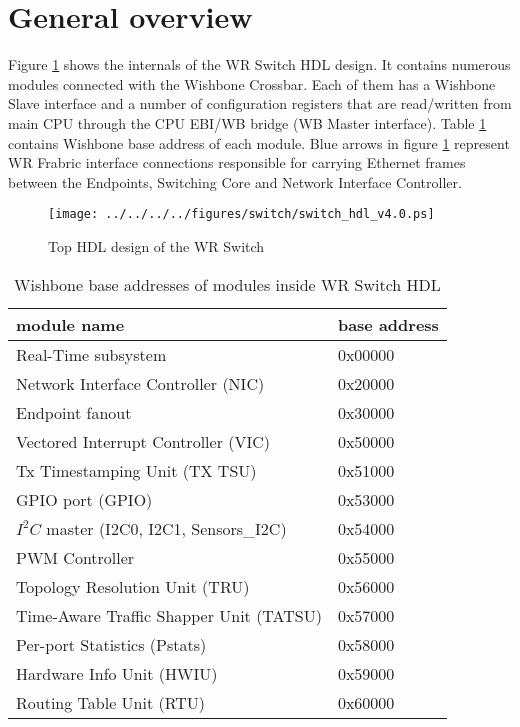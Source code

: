 \section{General overview}

Figure \ref{fig:switch_top} shows the internals of the WR Switch HDL
design. It contains numerous modules connected with the Wishbone Crossbar.
Each of them has a Wishbone Slave interface and a number of configuration
registers that are read/written from main CPU through the CPU EBI/WB bridge (WB
Master interface). Table \ref{tab:gov:wb_base} contains Wishbone base address of
each module. Blue arrows
in figure \ref{fig:switch_top} represent WR Frabric interface connections
responsible for carrying Ethernet frames between the Endpoints, Switching Core
and Network Interface \linebreak Controller.

\begin{figure}[ht]
  \begin{center}
    \texttt{[image: ../../../../figures/switch/switch\_hdl\_v4.0.ps]}
    \caption{Top HDL design of the WR Switch}
    \label{fig:switch_top}
  \end{center}
\end{figure}

\begin{table}
  \begin{center}
  \begin{tabular}{|l|l|}
    \hline
    module name & base address\\
    \hline \hline
    Real-Time subsystem & 0x00000\\
    Network Interface Controller (NIC) & 0x20000\\
    Endpoint fanout & 0x30000\\
    Vectored Interrupt Controller (VIC) & 0x50000\\
    Tx Timestamping Unit (TX TSU) & 0x51000\\
    GPIO port (GPIO)  & 0x53000\\
    $I^2C$ master (I2C0, I2C1, Sensors\_I2C) & 0x54000\\
    PWM Controller & 0x55000\\
    Topology Resolution Unit (TRU) & 0x56000\\
    Time-Aware Traffic Shapper Unit (TATSU) & 0x57000\\
    Per-port Statistics (Pstats) & 0x58000\\
    Hardware Info Unit (HWIU) & 0x59000\\
    Routing Table Unit (RTU) & 0x60000\\
    \hline
  \end{tabular}
  \caption{Wishbone base addresses of modules inside WR Switch HDL}
  \label{tab:gov:wb_base}
  \end{center}
\end{table}
